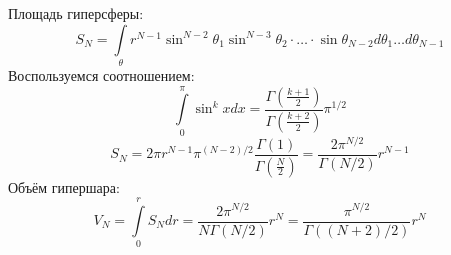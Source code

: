 Площадь гиперсферы:
\[
	S_N = \int\limits_{\theta} r^{N - 1} \sin^{N - 2} \theta_1 \sin^{N - 3} \theta_2 \cdot \ldots \cdot \sin \theta_{N - 2} d\theta_1 \ldots d\theta_{N - 1}
\]
Воспользуемся соотношением:
\[
	\int\limits_0^\pi \sin^k x dx = \frac{\Gamma\left(\frac{k + 1}{2}\right)}{\Gamma\left(\frac{k + 2}{2}\right)} \pi^{1/2}
\]
\[
	S_N = 2 \pi r^{N - 1} \pi^{(N - 2)/2} \frac{\Gamma(1)}{\Gamma\left(\frac{N}{2}\right)} =
	\frac{2 \pi^{N/2}}{\Gamma\left(N/2\right)} r^{N - 1}
\]
Объём гипершара:
\[
	V_N = \int\limits_0^r S_N dr = \frac{2 \pi^{N/2}}{N\Gamma\left(N/2\right)} r^{N} =
	\frac{\pi^{N/2}}{\Gamma\left((N + 2)/2\right)} r^{N}
\]